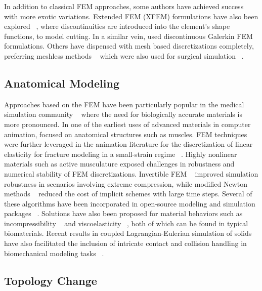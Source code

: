 In addition to classical FEM approaches, some authors have
achieved success with more exotic variations. Extended FEM (XFEM)
formulations have also been explored ~\citep{JerabK:2009}, where
discontinuities are introduced into the element's shape functions, to
model cutting. In a similar vein,
\citet{KaufmMBG:2009} used discontinuous Galerkin FEM
formulations. Others have dispensed with mesh based discretizations
completely, preferring meshless methods ~\citep{DeB:2000} which were
also used for surgical simulation ~\citep{DeKLS:2005}.

\subsection{Anatomical Modeling}
Approaches based on the FEM have been particularly popular in the
medical simulation community ~\citep{MarchADC:2008} where the need for
biologically accurate materials is more pronounced. In one of the
earliest uses of advanced materials in computer animation, \citet{ChenZ:1992} focused on anatomical structures such
as muscles. FEM techniques were further leveraged in the animation
literature for the discretization of linear elasticity for fracture
modeling in a small-strain regime ~\citep{OBriH:1999}. Highly
nonlinear materials such as active musculature \citet{TeranBHF:2003}
exposed challenges in robustness and numerical stability of FEM
discretizations. Invertible FEM ~\citep{IrvinTF:2004} improved
simulation robustness in scenarios involving extreme compression,
while modified Newton methods ~\citep{TeranSIF:2005} reduced the cost
of implicit schemes with large time steps. Several of these algorithms
have been incorporated in open-source modeling and simulation packages
~\citep{SinSB:2013}. Solutions have also been proposed for material
behaviors such as incompressibility ~\citep{IrvinSF:2007} and
viscoelasticity ~\citep{GokteBO:2004,WojtaT:2008}, both of which can
be found in typical biomaterials.  Recent results in coupled
Lagrangian-Eulerian simulation of solids have also facilitated the
inclusion of intricate contact and collision handling in biomechanical
modeling tasks ~\citep{SuedaKP:2008,LiSNP:2013,FanLP:2014}.

\subsection{Topology Change}

